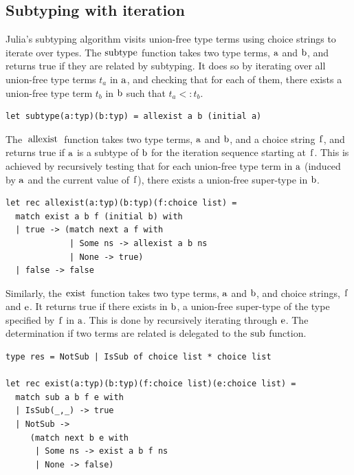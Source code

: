 \documentclass[a4paper,english]{lipics-v2019}
\renewcommand{\c}[1]{\ensuremath{\text{\lstinline{#1}}}\xspace}
\begin{document}
\subsection{Subtyping with iteration}

Julia's subtyping algorithm visits union-free type terms using choice
strings to iterate over types. The \c{subtype} function takes two type
terms, \c a and \c b, and returns true if they are related by
subtyping. It does so by iterating over all union-free type terms $t_a$ in \c a,
and checking that for each of them, there exists a union-free type term $t_b$ in
\c b such that $t_a <: t_b$.

\begin{lstlisting}
let subtype(a:typ)(b:typ) = allexist a b (initial a)
\end{lstlisting}

\noindent
The \c{allexist} function takes two type terms, \c a and \c b, and a choice
string \c f, and returns true if \c a is a subtype of \c b for the iteration
sequence starting at \c f. This is achieved by recursively testing that for
each union-free type term in \c a (induced by \c a and the current value of
\c f), there exists a union-free super-type in \c b.

\newpage
\begin{lstlisting}
let rec allexist(a:typ)(b:typ)(f:choice list) =
  match exist a b f (initial b) with 
  | true -> (match next a f with
             | Some ns -> allexist a b ns 
             | None -> true) 
  | false -> false
\end{lstlisting}

\noindent
Similarly, the \c{exist} function takes two type terms, \c a and \c b, and
choice strings, \c f and \c e. It returns true if there exists in \c b, a
union-free super-type of the type specified by \c f in \c a. This is done by
recursively iterating through \c e. The determination if two terms are
related is delegated to the \c{sub} function.

\begin{lstlisting}
type res = NotSub | IsSub of choice list * choice list

let rec exist(a:typ)(b:typ)(f:choice list)(e:choice list) =
  match sub a b f e with 
  | IsSub(_,_) -> true 
  | NotSub -> 
     (match next b e with
      | Some ns -> exist a b f ns 
      | None -> false) 
\end{lstlisting}
\end{document}
